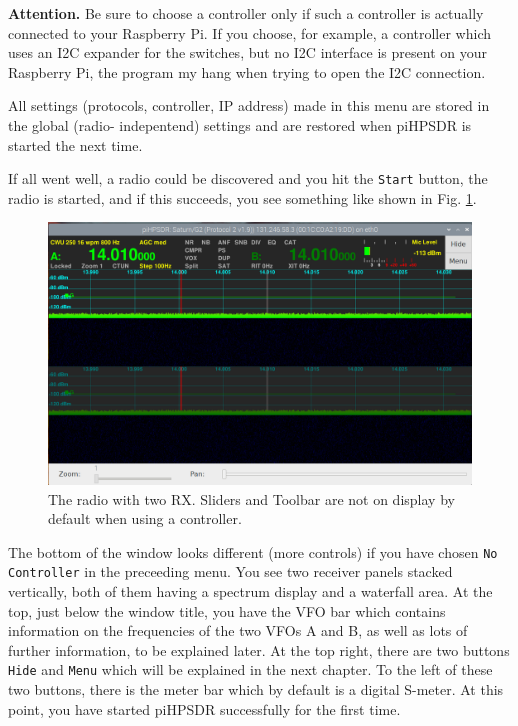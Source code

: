 \documentclass[12pt]{book}
\def\rett#1{\texttt{\color{red}#1}}
\begin{document}
\textbf{Attention.} Be sure to choose a controller only if such a controller is actually connected to your 
Raspberry Pi. If
you choose, for example, a controller which uses an I2C expander for the switches, but no I2C interface is 
present on
your Raspberry Pi, the program my hang when trying to open the I2C connection.

All settings (protocols, controller, IP address) made in this menu are stored in the global (radio-
indepentend) settings
and are restored when piHPSDR is started the next time. 

If all went well, a radio could be discovered and you hit the \rett{Start} button, the radio is started, and
if this succeeds, you see something like shown in Fig. \ref{fig:FirstDisplay}.

\begin{figure}
\center
\includegraphics[width=12cm]{FirstDisplay.png}
\caption{The radio with two RX. Sliders and Toolbar are not on display
by default when using a controller.}
\label{fig:FirstDisplay}
\end{figure}

The bottom of the window looks different (more controls) if you have chosen \rett{No Controller} in the 
preceeding menu.
You see two receiver panels stacked vertically, both of them having a spectrum display and a waterfall area. 
At the top,
just below the window title, you have the VFO bar which contains information on the frequencies of the two 
VFOs A and B,
as well as lots of further information, to be explained later. At the top right, there are two buttons 
\rett{Hide}
and \rett{Menu} which will be explained in the next chapter. To the left of these two buttons, there is the 
meter bar which by default is a digital S-meter. At this point, you have started piHPSDR successfully for 
the first time.
\end{document}

